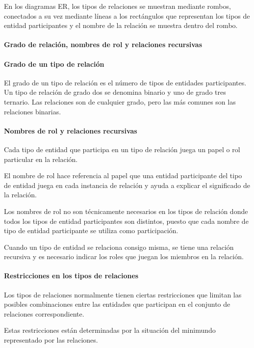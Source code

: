 En los diagramas ER, los tipos de relaciones se muestran mediante rombos, conectados a su vez mediante líneas a los rectángulos que representan los tipos de entidad participantes y el nombre de la relación se muestra dentro del rombo.


\paragraph*{Grado de relación, nombres de rol y relaciones recursivas}
\paragraph*{Grado de un tipo de relación}
El grado de un tipo de relación es el número de tipos de entidades participantes. Un tipo de relación de grado dos se denomina binario y uno de grado tres ternario. Las relaciones son de cualquier grado, pero las más comunes son las relaciones binarias.

\paragraph*{Nombres de rol y relaciones recursivas}
Cada tipo de entidad que participa en un tipo de relación juega un papel o rol particular en la relación.


El nombre de rol hace referencia al papel que una entidad participante del tipo de entidad juega en cada instancia de relación y ayuda a explicar el significado de la relación.


Los nombres de rol no son técnicamente necesarios en los tipos de relación donde todos los tipos de entidad participantes son distintos, puesto que cada nombre de tipo de entidad participante se utiliza como participación.

Cuando un tipo de entidad se relaciona consigo misma, se tiene una relación recursiva y es necesario indicar los roles que juegan los miembros en la relación.


\paragraph*{Restricciones en los tipos de relaciones}


Los tipos de relaciones normalmente tienen ciertas restricciones que limitan las posibles combinaciones entre las entidades que participan en el conjunto de relaciones correspondiente.


Estas restricciones están determinadas por la situación del minimundo representado por las relaciones. 


